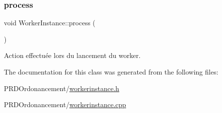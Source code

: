 \subsubsection{\texorpdfstring{process}{process}}
{\footnotesize\ttfamily void Worker\+Instance\+::process (\begin{DoxyParamCaption}{ }\end{DoxyParamCaption})\hspace{0.3cm}{\ttfamily [slot]}}



Action effectuée lors du lancement du worker. 



The documentation for this class was generated from the following files\+:\begin{DoxyCompactItemize}
\item 
P\+R\+D\+Ordonancement/\hyperlink{workerinstance_8h}{workerinstance.\+h}\item 
P\+R\+D\+Ordonancement/\hyperlink{workerinstance_8cpp}{workerinstance.\+cpp}\end{DoxyCompactItemize}
